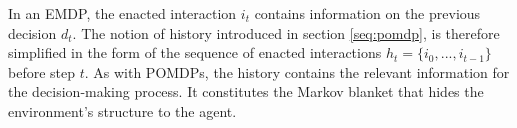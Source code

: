 In an EMDP, the enacted interaction $i_t$ contains information on the previous decision $d_t$.
The notion of history introduced in section \ref{seq:pomdp}, is therefore simplified in the form of the sequence of enacted interactions $h_t = \{i_0, ..., i_{t-1}\}$ before step $t$.
As with POMDPs, the history contains the relevant information for the decision-making process.
It constitutes the Markov blanket that hides the environment's structure to the agent.



